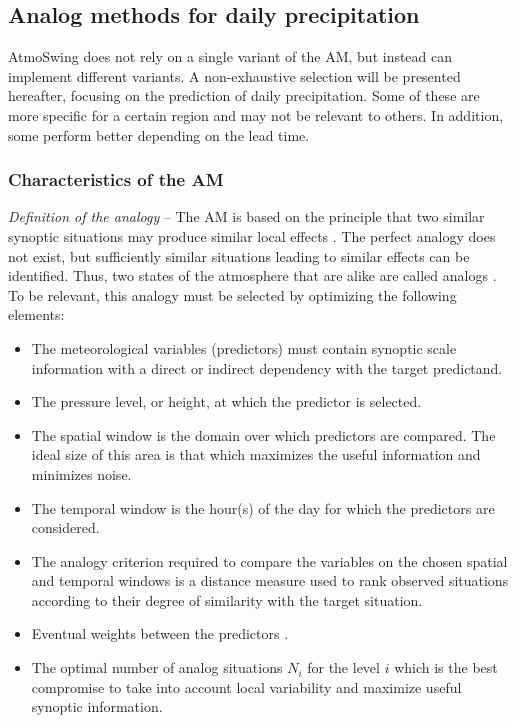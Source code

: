 \documentclass[review]{elsarticle}
\begin{document}
\subsection{Analog methods for daily precipitation}
\label{sec:method}

AtmoSwing does not rely on a single variant of the AM, but instead can implement different variants. A non-exhaustive selection will be presented hereafter, focusing on the prediction of daily precipitation. Some of these are more specific for a certain region and may not be relevant to others. In addition, some perform better depending on the lead time.


\subsubsection{Characteristics of the AM}

\textit{Definition of the analogy} -- The AM is based on the principle that two similar synoptic situations may produce similar local effects \citep{Lorenz1956}. The perfect analogy does not exist, but sufficiently similar situations leading to similar effects can be identified. Thus, two states of the atmosphere that are alike are called analogs \citep{Lorenz1969}. To be relevant, this analogy must be selected by optimizing the following elements:

\begin{itemize}		
	\item The meteorological variables (predictors) must contain synoptic scale information with a direct or indirect dependency with the target predictand.
	\item The pressure level, or height, at which the predictor is selected.
	\item The spatial window is the domain over which predictors are compared. The ideal size of this area is that which maximizes the useful information and minimizes noise.
	\item The temporal window is the hour(s) of the day for which the predictors are considered.
	\item The analogy criterion required to compare the variables on the chosen spatial and temporal windows is a distance measure used to rank observed situations according to their degree of similarity with the target situation.
	\item Eventual weights between the predictors \cite[e.g.,][]{Horton2017b, Junk2015}.
	\item The optimal number of analog situations $N_{i}$ for the level $i$ which is the best compromise to take into account local variability and maximize useful synoptic information.
\end{itemize}
\end{document}
